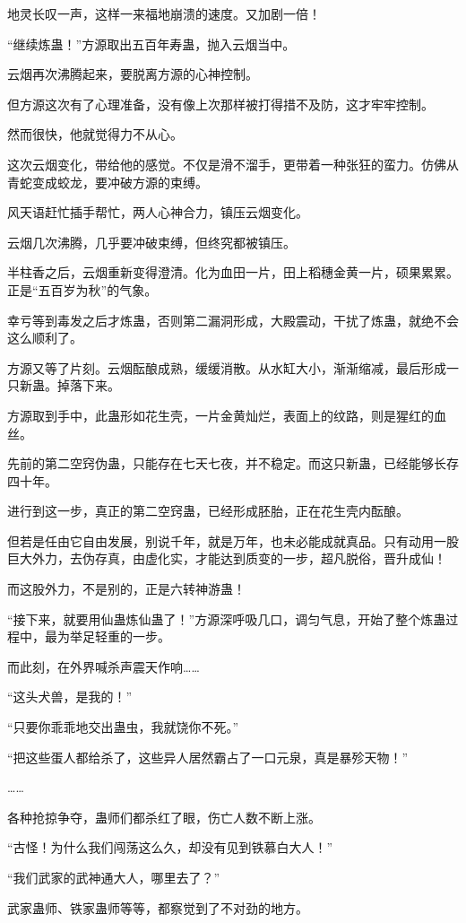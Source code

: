 \begin{this_body}
地灵长叹一声，这样一来福地崩溃的速度。又加剧一倍！

“继续炼蛊！”方源取出五百年寿蛊，抛入云烟当中。

云烟再次沸腾起来，要脱离方源的心神控制。

但方源这次有了心理准备，没有像上次那样被打得措不及防，这才牢牢控制。

然而很快，他就觉得力不从心。

这次云烟变化，带给他的感觉。不仅是滑不溜手，更带着一种张狂的蛮力。仿佛从青蛇变成蛟龙，要冲破方源的束缚。

风天语赶忙插手帮忙，两人心神合力，镇压云烟变化。

云烟几次沸腾，几乎要冲破束缚，但终究都被镇压。

半柱香之后，云烟重新变得澄清。化为血田一片，田上稻穗金黄一片，硕果累累。正是“五百岁为秋”的气象。

幸亏等到毒发之后才炼蛊，否则第二漏洞形成，大殿震动，干扰了炼蛊，就绝不会这么顺利了。

方源又等了片刻。云烟酝酿成熟，缓缓消散。从水缸大小，渐渐缩减，最后形成一只新蛊。掉落下来。

方源取到手中，此蛊形如花生壳，一片金黄灿烂，表面上的纹路，则是猩红的血丝。

先前的第二空窍伪蛊，只能存在七天七夜，并不稳定。而这只新蛊，已经能够长存四十年。

进行到这一步，真正的第二空窍蛊，已经形成胚胎，正在花生壳内酝酿。

但若是任由它自由发展，别说千年，就是万年，也未必能成就真品。只有动用一股巨大外力，去伪存真，由虚化实，才能达到质变的一步，超凡脱俗，晋升成仙！

而这股外力，不是别的，正是六转神游蛊！

“接下来，就要用仙蛊炼仙蛊了！”方源深呼吸几口，调匀气息，开始了整个炼蛊过程中，最为举足轻重的一步。

而此刻，在外界喊杀声震天作响……

“这头犬兽，是我的！”

“只要你乖乖地交出蛊虫，我就饶你不死。”

“把这些蛋人都给杀了，这些异人居然霸占了一口元泉，真是暴殄天物！”

……

各种抢掠争夺，蛊师们都杀红了眼，伤亡人数不断上涨。

“古怪！为什么我们闯荡这么久，却没有见到铁慕白大人！”

“我们武家的武神通大人，哪里去了？”

武家蛊师、铁家蛊师等等，都察觉到了不对劲的地方。


\end{this_body}
